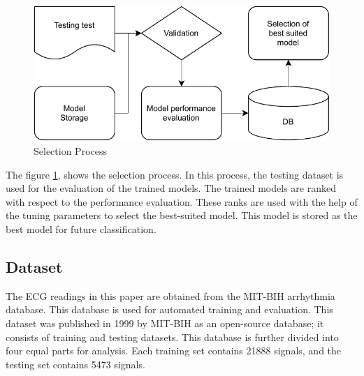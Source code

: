 \begin{figure}[ht]
    \centering
    \includegraphics[width=0.7\columnwidth]{media/design/Selector.pdf}
    \caption{Selection Process}
    \label{fig:selection_process}
\end{figure}

The figure \ref{fig:selection_process}, shows the selection process. In this process, the testing dataset is used for the evaluation of the trained models. The trained models are ranked with respect to the performance evaluation. These ranks are used with the help of the tuning parameters to select the best-suited model. This model is stored as the best model for future classification.

\subsection{Dataset}
The ECG readings in this paper are obtained from the MIT-BIH arrhythmia database. This database is used for automated training and evaluation. This dataset was published in 1999 by MIT-BIH as an open-source database; it consists of training and testing datasets. This database is further divided into four equal parts for analysis. Each training set contains 21888 signals, and the testing set contains 5473 signals.